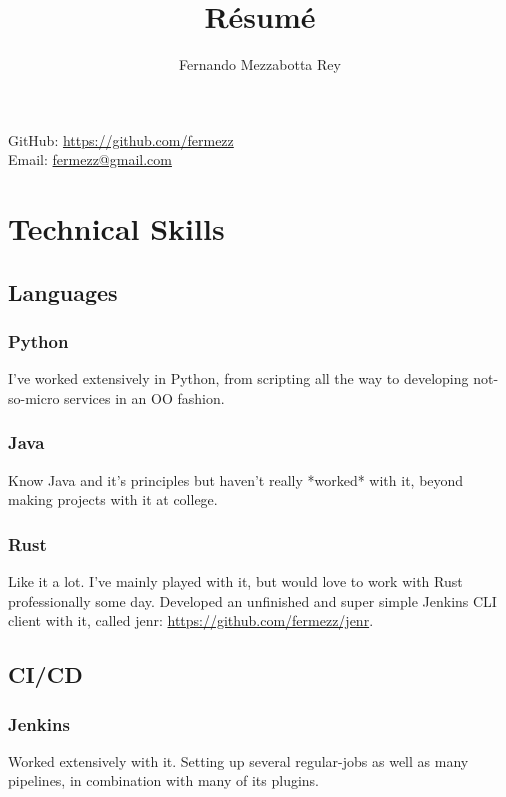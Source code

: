 \documentclass{article}
\makeatletter
\renewcommand{\maketitle}
{\begin{center}
{\huge\bfseries
\theauthor}

\vspace{.5em}

GitHub: \url{https://github.com/fermezz}\\Email: \url{fermezz@gmail.com}

\end{center}}
\makeatother
\begin{document}
\title{R\'esum\'e}
\author{Fernando Mezzabotta Rey}

\maketitle

\section{Technical Skills}
\subsection{Languages}
\subsubsection{Python}
  \begin{description}
    \item I've worked extensively in Python, from scripting all the way to developing not-so-micro services in an OO fashion.
  \end{description}
\subsubsection{Java}
  \begin{description}
    \item Know Java and it's principles but haven't really *worked* with it, beyond making projects with it at college.
  \end{description}
\subsubsection{Rust}
  \begin{description}
    \item Like it a lot. I've mainly played with it, but would love to work with Rust professionally some day. Developed an unfinished and super simple Jenkins CLI client with it, called jenr: \url{https://github.com/fermezz/jenr}.
  \end{description}
\subsection{CI/CD}
\subsubsection{Jenkins}
  \begin{description}
    \item Worked extensively with it. Setting up several regular-jobs as well as many pipelines, in combination with many of its plugins.
  \end{description}
\end{document}
